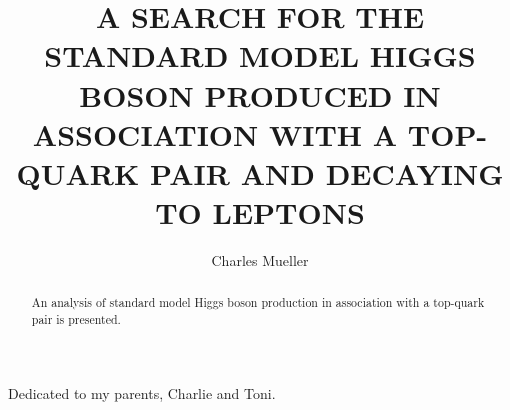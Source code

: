 \documentclass[final,numrefs,sort&compress,noinfo]{nddiss2e}
\begin{document}
\frontmatter         %

\title{A SEARCH FOR THE STANDARD MODEL HIGGS BOSON PRODUCED IN ASSOCIATION WITH A TOP-QUARK PAIR AND DECAYING TO LEPTONS}
\author{Charles Mueller}           %

\maketitle           %

\makecopyright      %



\begin{abstract}
  An analysis of standard model Higgs boson production in association with 
  a top-quark pair is presented.
\end{abstract}


\begin{dedication}
Dedicated to my parents, Charlie and Toni.
\end{dedication}

\tableofcontents
\listoffigures
\listoftables
\end{document}
